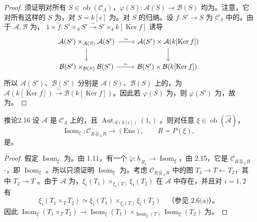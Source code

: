 \begin{proof}
须证明对所有 $S\in\operatorname{ob}(\mathcal C_\Lambda)$，$\varphi(S):\mathcal A(S)\to\mathcal B(S)$ 均为。注意，它对所有这样的 $S$ 为，对 $S=k[\epsilon]$ 为。对 $S$ 的归纳。设 $f:S'\to S$ 为 $\mathcal C_\Lambda$ 中的。由于 $\mathcal A,\mathcal B$ 为，
$1\times\widetilde f:S'\times_SS'\xrightarrow\sim S'\times_k k[\operatorname{Ker}f]$ 诱导
\[
\begin{tikzcd}
\mathcal A(S')\times_{\mathcal A(S)}\mathcal A(S')\arrow[r,"\sim"]\arrow[d]&\mathcal A(S')\times\mathcal A(k[\operatorname{Ker}f])\arrow[d]\\
\mathcal B(S')\times_{\mathcal B(S)}\mathcal B(S')\arrow[r,"\sim"]&\mathcal B(S')\times\mathcal B(k[\operatorname{Ker}f]).
\end{tikzcd}
\]
所以 $\mathcal A(S')$、$\mathcal B(S')$ 分别是 $\mathcal A(S)$、$\mathcal B(S)$ 上的，为 $\mathcal A(k[\operatorname{Ker}f])\xrightarrow\sim\mathcal B(k[\operatorname{Ker}f])$。因此若 $\varphi(S)$ 为，则 $\varphi(S')$ 为，故为。
\end{proof}
\begin{SGAresult}{推论}{2.16}
设 $\mathcal A$ 是 $\mathcal C_\Lambda$ 上的，且 $\operatorname{Aut}_{\mathcal A(k[\epsilon])}(1_\epsilon)$ 。则对任意 $\xi\in\operatorname{ob}(\widehat{\mathcal A})$，
\[\operatorname{Isom}_\xi:\mathcal C_{R\widehat\otimes_\Lambda R}\longrightarrow(\mathrm{Ens}),\qquad R=P(\xi),\]
是。
\end{SGAresult}
\begin{proof}
假定 $\operatorname{Isom}_\xi$ 为。由 1.11，有一个 $\widetilde\varphi:\underline h_{R_1}\to\operatorname{Isom}_\xi$，由 2.15，它是 $\mathcal C_{R\widehat\otimes_\Lambda R}$-，即 $\operatorname{Isom}_\xi$ 。所以只须证明 $\operatorname{Isom}_\xi$ 为。考虑 $\mathcal C_{R\widehat\otimes_\Lambda R}$ 中的图 $T_1\to T\leftarrow T_2$，其中 $T_2\to T$ 。由于 $\mathcal A$ 为，$\xi_i(T_1)\times_{\xi_i(T)}\xi_i(T_2)$ 在 $\mathcal A$ 中存在，并且对 $i=1,2$ 有
\[\xi_i(T_1\times_TT_2)\simeq\xi_i(T_1)\times_{\xi_i(T)}\xi_i(T_2)\quad\text{（参见 2.6(a)）。}\]
因此 $\operatorname{Isom}_\xi(T_1\times_TT_2)\to\operatorname{Isom}_\xi(T_1)\times_{\operatorname{Isom}_\xi(T)}\operatorname{Isom}_\xi(T_2)$ 为。
\end{proof}
